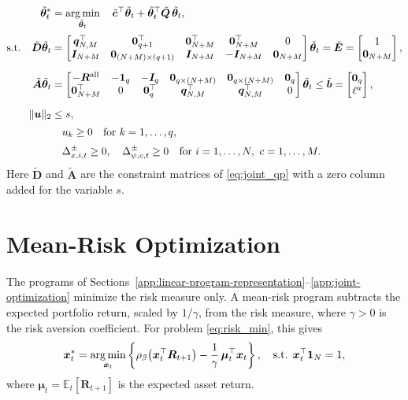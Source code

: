 \begin{equation}
\begin{aligned}
    \tilde{\bm{\theta}}_t^* &= \operatorname*{arg\,min}_{\tilde{\bm{\theta}}_t} \quad
    \tilde{\bm{c}}^\top \tilde{\bm{\theta}}_t + \tilde{\bm{\theta}}_t^\top \tilde{\bm{Q}}\, \tilde{\bm{\theta}}_t, \\[2pt]
    \text{s.t.} \quad
    \tilde{\bm{D}} \tilde{\bm{\theta}}_t &=
    \begin{bmatrix} \bm{q}_{N,M}^\top & \bm{0}_{q+1}^\top & \bm{0}_{N+M}^\top & \bm{0}_{N+M}^\top & 0 \\
    \bm{I}_{N+M} & \bm{0}_{(N+M) \times (q+1)} & \bm{I}_{N+M} & -\bm{I}_{N+M} & \bm{0}_{N+M} \end{bmatrix} \tilde{\bm{\theta}}_t
    = \tilde{\bm{E}} = \begin{bmatrix} 1 \\ \bm{0}_{N+M} \end{bmatrix}, \\[6pt]
    \tilde{\bm{A}} \tilde{\bm{\theta}}_t &=
    \begin{bmatrix} -\bm{R}^{\text{all}} & -\bm{1}_q & -\bm{I}_q & \bm{0}_{q \times (N+M)} & \bm{0}_{q \times (N+M)} & \bm{0}_q \\
    \bm{0}_{N+M}^\top & 0 & \bm{0}_q^\top & \bm{q}_{N,M}^\top & \bm{q}_{N,M}^\top & 0 \end{bmatrix} \tilde{\bm{\theta}}_t
    \le \tilde{\bm{b}} = \begin{bmatrix} \bm{0}_q \\ \ell^a \end{bmatrix}, \\[6pt]
    \|\bm{u}\|_2 &\le s, \\[2pt]
    & \quad u_k \ge 0 \quad \text{for } k = 1, \dots, q, \\[2pt]
    & \quad \Delta_{x,i,t}^\pm \ge 0,\quad \Delta_{\psi,c,t}^\pm \ge 0
    \quad \text{for } i = 1, \dots, N,\ c = 1, \dots, M.
\end{aligned}
\end{equation}
Here $\tilde{\bm{D}}$ and $\tilde{\bm{A}}$ are the constraint matrices of \eqref{eq:joint_qp} with a zero column
added for the variable $s$.

\section{Mean-Risk Optimization} \label{app:mean-risk}

The programs of Sections~\ref{app:linear-program-representation}--\ref{app:joint-optimization} minimize the risk
measure only. A mean-risk program subtracts the expected portfolio return, scaled by $1/\gamma$, from the risk measure, where
$\gamma > 0$ is the risk aversion coefficient. For problem \eqref{eq:risk_min}, this gives
\begin{equation}
    \bm{x}_t^* = \operatorname*{arg\,min}_{\bm{x}_t} \left\{ \rho_\beta\bigl( \bm{x}_t^\top \bm{R}_{t+1} \bigr)
    - \frac{1}{\gamma}\, \bm{\mu}_t^\top \bm{x}_t \right\}, \quad \text{s.t. } \bm{x}_t^\top \bm{1}_N = 1,
\end{equation}
where $\bm{\mu}_t = \mathbb{E}_t[\bm{R}_{t+1}]$ is the expected asset return.

